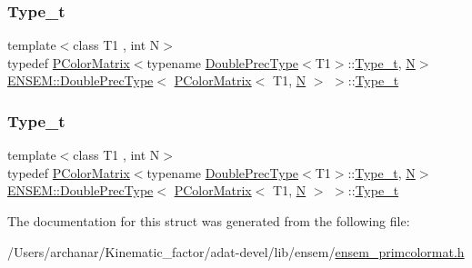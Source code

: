 \subsubsection{\texorpdfstring{Type\_t}{Type\_t}\hspace{0.1cm}{\footnotesize\ttfamily [2/3]}}
{\footnotesize\ttfamily template$<$class T1 , int N$>$ \\
typedef \mbox{\hyperlink{classENSEM_1_1PColorMatrix}{P\+Color\+Matrix}}$<$typename \mbox{\hyperlink{structENSEM_1_1DoublePrecType}{Double\+Prec\+Type}}$<$T1$>$\+::\mbox{\hyperlink{structENSEM_1_1DoublePrecType_3_01PColorMatrix_3_01T1_00_01N_01_4_01_4_ad34f205ddad59c047cf49ac9972cdaeb}{Type\+\_\+t}}, \mbox{\hyperlink{adat__devel_2lib_2hadron_2operator__name__util_8cc_a7722c8ecbb62d99aee7ce68b1752f337}{N}}$>$ \mbox{\hyperlink{structENSEM_1_1DoublePrecType}{E\+N\+S\+E\+M\+::\+Double\+Prec\+Type}}$<$ \mbox{\hyperlink{classENSEM_1_1PColorMatrix}{P\+Color\+Matrix}}$<$ T1, \mbox{\hyperlink{adat__devel_2lib_2hadron_2operator__name__util_8cc_a7722c8ecbb62d99aee7ce68b1752f337}{N}} $>$ $>$\+::\mbox{\hyperlink{structENSEM_1_1DoublePrecType_3_01PColorMatrix_3_01T1_00_01N_01_4_01_4_ad34f205ddad59c047cf49ac9972cdaeb}{Type\+\_\+t}}}

\mbox{\label{structENSEM_1_1DoublePrecType_3_01PColorMatrix_3_01T1_00_01N_01_4_01_4_ad34f205ddad59c047cf49ac9972cdaeb}} 
\subsubsection{\texorpdfstring{Type\_t}{Type\_t}\hspace{0.1cm}{\footnotesize\ttfamily [3/3]}}
{\footnotesize\ttfamily template$<$class T1 , int N$>$ \\
typedef \mbox{\hyperlink{classENSEM_1_1PColorMatrix}{P\+Color\+Matrix}}$<$typename \mbox{\hyperlink{structENSEM_1_1DoublePrecType}{Double\+Prec\+Type}}$<$T1$>$\+::\mbox{\hyperlink{structENSEM_1_1DoublePrecType_3_01PColorMatrix_3_01T1_00_01N_01_4_01_4_ad34f205ddad59c047cf49ac9972cdaeb}{Type\+\_\+t}}, \mbox{\hyperlink{adat__devel_2lib_2hadron_2operator__name__util_8cc_a7722c8ecbb62d99aee7ce68b1752f337}{N}}$>$ \mbox{\hyperlink{structENSEM_1_1DoublePrecType}{E\+N\+S\+E\+M\+::\+Double\+Prec\+Type}}$<$ \mbox{\hyperlink{classENSEM_1_1PColorMatrix}{P\+Color\+Matrix}}$<$ T1, \mbox{\hyperlink{adat__devel_2lib_2hadron_2operator__name__util_8cc_a7722c8ecbb62d99aee7ce68b1752f337}{N}} $>$ $>$\+::\mbox{\hyperlink{structENSEM_1_1DoublePrecType_3_01PColorMatrix_3_01T1_00_01N_01_4_01_4_ad34f205ddad59c047cf49ac9972cdaeb}{Type\+\_\+t}}}



The documentation for this struct was generated from the following file\+:\begin{DoxyCompactItemize}
\item 
/\+Users/archanar/\+Kinematic\+\_\+factor/adat-\/devel/lib/ensem/\mbox{\hyperlink{adat-devel_2lib_2ensem_2ensem__primcolormat_8h}{ensem\+\_\+primcolormat.\+h}}\end{DoxyCompactItemize}
